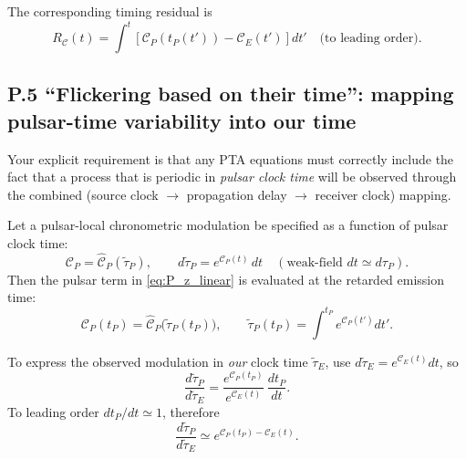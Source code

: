 \documentclass[10pt]{article}
\newcommand{\Eclk}{E}
\begin{document}
The corresponding timing residual is
\begin{equation}
R_\mathcal{C}(t)
=
\int^t \left[\mathcal{C}_P(t_P(t'))-\mathcal{C}_{\Eclk}(t')\right]dt'
\quad\text{(to leading order)}.
\label{eq:P_residual_main}
\end{equation}

\subsection{P.5 ``Flickering based on their time'': mapping pulsar-time variability into our time}
\label{app:pta:flicker}

Your explicit requirement is that any PTA equations must correctly include the fact that a process
that is periodic in \emph{pulsar clock time} will be observed through the combined
(source clock $\rightarrow$ propagation delay $\rightarrow$ receiver clock) mapping.

Let a pulsar-local chronometric modulation be specified as a function of pulsar clock time:
\begin{equation}
\mathcal{C}_P = \widehat{\mathcal{C}}_P(\tilde\tau_P),
\qquad
d\tilde\tau_P = e^{\mathcal{C}_P(t)}\,dt
\quad(\text{weak-field }dt\simeq d\tau_P).
\label{eq:P_Cp_of_tautilde}
\end{equation}
Then the pulsar term in \eqref{eq:P_z_linear} is evaluated at the retarded emission time:
\begin{equation}
\mathcal{C}_P(t_P)=\widehat{\mathcal{C}}_P\!\bigl(\tilde\tau_P(t_P)\bigr),
\qquad
\tilde\tau_P(t_P)=\int^{t_P} e^{\mathcal{C}_P(t')}dt'.
\label{eq:P_retarded_mapping}
\end{equation}

To express the observed modulation in \emph{our} clock time $\tilde\tau_{\Eclk}$,
use $d\tilde\tau_E=e^{\mathcal{C}_E(t)}dt$, so
\begin{equation}
\frac{d\tilde\tau_P}{d\tilde\tau_{\Eclk}}
=
\frac{e^{\mathcal{C}_P(t_P)}}{e^{\mathcal{C}_{\Eclk}(t)}}\,
\frac{dt_P}{dt}.
\label{eq:P_time_warp}
\end{equation}
To leading order $dt_P/dt\simeq 1$, therefore
\begin{equation}
\frac{d\tilde\tau_P}{d\tilde\tau_{\Eclk}}
\simeq
e^{\mathcal{C}_P(t_P)-\mathcal{C}_{\Eclk}(t)}.
\label{eq:P_time_warp_simple}
\end{equation}
\end{document}
